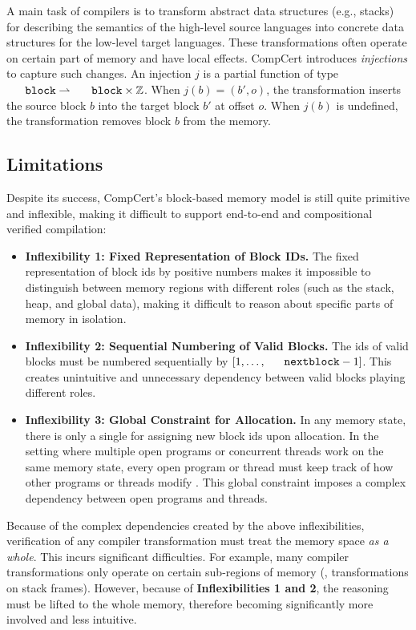 A main task of compilers is to transform abstract data structures
(e.g., stacks) for describing the semantics of the high-level source
languages into concrete data structures for the low-level target
languages. These transformations often operate on certain part of
memory and have local effects.
%
CompCert introduces \emph{injections} to capture such changes. An
injection $j$ is a partial function of type
$\code{block} \rightharpoonup \code{block} \times \mathbb{Z}$.
When $j(b) = (b',o)$,
the transformation inserts the source block $b$ into
the target block $b'$ at offset $o$.
When $j(b)$ is undefined,
the transformation removes block $b$ from the memory.

\subsection{Limitations}
\label{ssec:intro-nmm}

Despite its success, CompCert's block-based memory model is
still quite primitive and inflexible, making it difficult to support
end-to-end and compositional verified compilation: 

\begin{itemize}
\item 
\textbf{Inflexibility 1: Fixed Representation of Block IDs.}
%
The fixed representation of block ids by positive numbers
makes it impossible to distinguish between memory regions
with different roles (such as the stack, heap, and global
data), making it difficult to reason about specific parts of
memory in isolation.

\item
\textbf{Inflexibility 2: Sequential Numbering of Valid Blocks.}  
%
The ids of valid
blocks must be numbered sequentially by $[1,\ldots,\nextblock-1]$.
This creates unintuitive and unnecessary dependency between valid
blocks playing different roles.

\item
\textbf{Inflexibility 3: Global Constraint for Allocation.}
%
In any memory state, there is only a single \nextblock for assigning
new block ids upon allocation. In the setting where multiple open
programs or concurrent threads work on the same memory state, every
open program or thread must keep track of how other programs or
threads modify \nextblock. This global constraint imposes a complex
dependency between open programs and threads.
\end{itemize}

Because of the complex dependencies created by the above
inflexibilities, verification of any compiler transformation must
treat the memory space \emph{as a whole}. This incurs significant
difficulties.
For example, many
compiler transformations only operate on certain sub-regions of memory
(\eg, transformations on stack frames). However, because of
\textbf{Inflexibilities 1 and 2}, the reasoning must be lifted to the
whole memory, therefore becoming significantly more involved and less
intuitive.

